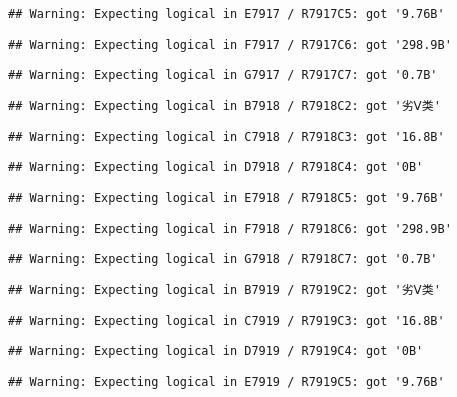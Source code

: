 \documentclass[
]{article}
\begin{document}
\begin{verbatim}
## Warning: Expecting logical in E7917 / R7917C5: got '9.76B'
\end{verbatim}

\begin{verbatim}
## Warning: Expecting logical in F7917 / R7917C6: got '298.9B'
\end{verbatim}

\begin{verbatim}
## Warning: Expecting logical in G7917 / R7917C7: got '0.7B'
\end{verbatim}

\begin{verbatim}
## Warning: Expecting logical in B7918 / R7918C2: got '劣Ⅴ类'
\end{verbatim}

\begin{verbatim}
## Warning: Expecting logical in C7918 / R7918C3: got '16.8B'
\end{verbatim}

\begin{verbatim}
## Warning: Expecting logical in D7918 / R7918C4: got '0B'
\end{verbatim}

\begin{verbatim}
## Warning: Expecting logical in E7918 / R7918C5: got '9.76B'
\end{verbatim}

\begin{verbatim}
## Warning: Expecting logical in F7918 / R7918C6: got '298.9B'
\end{verbatim}

\begin{verbatim}
## Warning: Expecting logical in G7918 / R7918C7: got '0.7B'
\end{verbatim}

\begin{verbatim}
## Warning: Expecting logical in B7919 / R7919C2: got '劣Ⅴ类'
\end{verbatim}

\begin{verbatim}
## Warning: Expecting logical in C7919 / R7919C3: got '16.8B'
\end{verbatim}

\begin{verbatim}
## Warning: Expecting logical in D7919 / R7919C4: got '0B'
\end{verbatim}

\begin{verbatim}
## Warning: Expecting logical in E7919 / R7919C5: got '9.76B'
\end{verbatim}
\end{document}

